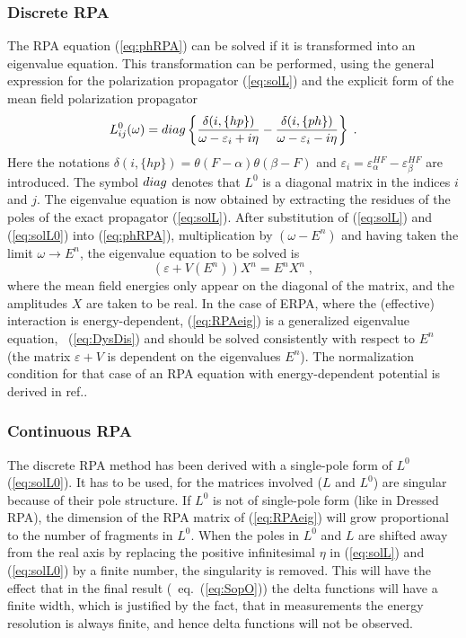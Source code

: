 \subsubsection{Discrete RPA\label{sec:RPAdisc}}
The RPA equation (\ref{eq:phRPA}) can be solved if it is transformed into an
eigenvalue equation. 
This transformation can be performed,
using the general expression for the polarization propagator
(\ref{eq:solL}) and the explicit form of the mean field polarization propagator
%
	\begin{equation}
		L^0_{ij}(\omega)
	=
		{\sc diag} 
		\left\{
		\frac{ \delta(i,\{hp\})}
		{ \omega - \varepsilon_i + i \eta}
	-
		\frac{\delta(i,\{ph\})}
		{ \omega - \varepsilon_i - i \eta}
		\right\}
	\label{eq:solL0}
	\;.
	\end{equation}
%
Here the notations $\delta(i,\{hp\})=\theta(F-\alpha)\theta(\beta-F)$ and
$\varepsilon_i=\varepsilon^{HF}_\alpha-\varepsilon^{HF}_\beta$ are introduced. 
The
symbol ${\sc diag}$ denotes that $L^0$ is a diagonal matrix in the indices 
$i$ and $j$.
The eigenvalue equation is now obtained by extracting the residues of
the poles of the exact propagator (\ref{eq:solL}). After substitution of
(\ref{eq:solL}) and (\ref{eq:solL0}) into (\ref{eq:phRPA}), multiplication by 
 $(\omega - E^n)$ and having taken the limit 
 $\omega \rightarrow E^n$, the eigenvalue equation to be
solved is
%
	\begin{equation}
		\left(
			\varepsilon 
		+
			V(E^n)
		\right)X^n
	=
		E^n X^n
	\label{eq:RPAeig}
	\;,
	\end{equation}
%
where the mean field energies only appear on the diagonal of the matrix, and
the amplitudes $X$ are taken to be real. In the case of ERPA, where
the (effective) interaction is energy-dependent, (\ref{eq:RPAeig})  is a 
generalized eigenvalue equation, \cf\ (\ref{eq:DysDis}) and should be
solved consistently with respect to $E^n$ (the matrix $\varepsilon +V$ is 
dependent on the eigenvalues $E^n$).
The normalization condition for that case of an RPA equation with 
energy-dependent potential is derived in ref.\cite{HDA86,AEG93}.

\subsubsection{Continuous RPA}
The discrete RPA method has been derived with a single-pole form of $L^0$ 
(\ref{eq:solL0}).
It has to be used, for the matrices involved ($L$ and $L^0$)
 are singular because
of their pole structure. If $L^0$ is not of single-pole form (like in 
Dressed RPA), the dimension of the RPA matrix of (\ref{eq:RPAeig}) will 
grow proportional to the number of fragments in $L^0$.
When  the poles in $L^0$ and $L$ are shifted
away from the real axis by replacing the positive infinitesimal $\eta$ in 
(\ref{eq:solL}) and (\ref{eq:solL0}) by a finite number, the singularity is 
removed.
This will have the effect that 
in the final result (\cf\ eq.~(\ref{eq:SopO})) the delta functions 
will have a finite width, which is justified by the fact, 
that in measurements the energy resolution is always finite, and hence delta
functions will not be observed. 

